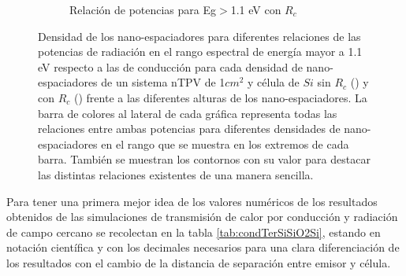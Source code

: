 \begin{figure}[H]
\begin{subfigure}[b]{0.49\textwidth}
	\caption{Relación de potencias para Eg$>$1.1 eV con $R_c$}
	\label{fig:rel_SiSi11_Rc}
\end{subfigure}
\caption{Densidad de los nano-espaciadores para diferentes relaciones de las potencias de radiación en el rango espectral de energía mayor a 1.1 eV respecto a las de conducción para cada densidad de nano-espaciadores de un sistema nTPV de 1$cm^2$ y célula de $Si$ sin $R_c$ () y con $R_c$ () frente a las diferentes alturas de los nano-espaciadores. La barra de colores al lateral de cada gráfica representa todas las relaciones entre ambas potencias para diferentes densidades de nano-espaciadores en el rango que se muestra en los extremos de cada barra. También se muestran los contornos con su valor para destacar las distintas relaciones existentes de una manera sencilla.}
	\label{fig:rels_SiSi11}
\end{figure}
Para tener una primera mejor idea de los valores numéricos de los resultados obtenidos de las simulaciones de transmisión de calor por conducción y radiación de campo cercano se recolectan en la tabla \ref{tab:condTerSiSiO2Si}, estando en notación científica y con los decimales necesarios para una clara diferenciación de los resultados con el cambio de la distancia de separación entre emisor y célula.
